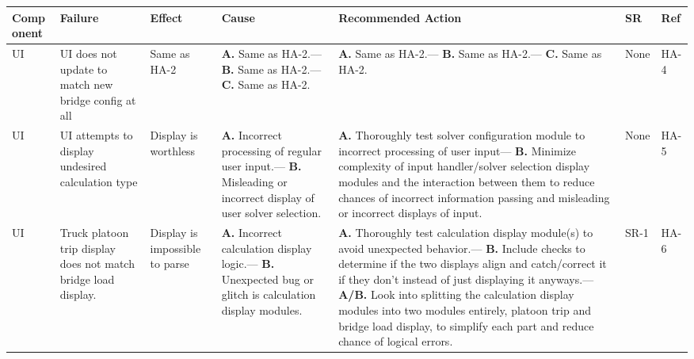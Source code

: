 \documentclass{article}
\begin{document}
\begin{table}[H]
    \begin{tabular}{|p{} | p{} | p{} | p{} | p{} | p{} | p{}|}
    \toprule
    \textbf{Comp onent} & \textbf{Failure} & \textbf{Effect} & \textbf{Cause} & \textbf{Recommended Action} & \textbf{SR} & \textbf{Ref}\\
\midrule
    UI & UI does not update to match new bridge config at all & Same as HA-2 &  \textbf{A.} Same as HA-2.---  
    \textbf{B.} Same as HA-2.---
    \textbf{C.} Same as HA-2.
&   \textbf{A.} Same as HA-2.---
    \textbf{B.}  Same as HA-2.---
    \textbf{C.} Same as HA-2.
    &None&HA-4\\
\midrule
    UI&UI attempts to display undesired calculation type&Display is worthless&\textbf{A.} Incorrect processing of regular user input.---
    \textbf{B.} Misleading or incorrect display of user solver selection.
    &\textbf{A.} Thoroughly test solver configuration module to incorrect processing of user input---
    \textbf{B.} Minimize complexity of input handler/solver selection display modules and the interaction between them to reduce chances of incorrect information passing
     and misleading or incorrect displays of input.
    &None&HA-5\\
\midrule
    UI&Truck platoon trip display does not match bridge load display.
    &Display is impossible to parse&\textbf{A.} Incorrect calculation display logic.---
    \textbf{B.} Unexpected bug or glitch is calculation display modules.
&\textbf{A.} Thoroughly test calculation display module(s) to avoid unexpected behavior.---
\textbf{B.} Include checks to determine if the two displays align and catch/correct it if they don’t instead of just displaying it anyways.---
\textbf{A/B.} Look into splitting the calculation display modules into two modules entirely, platoon trip and bridge load display, to simplify each part and 
reduce chance of logical errors.
&SR-1&HA-6\\
\bottomrule
  \end{tabular}
  \end{table}
  \pagebreak
\end{document}
